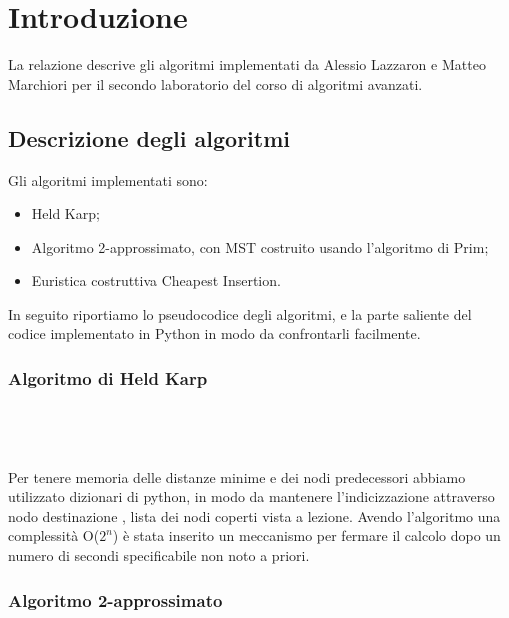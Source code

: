 \chapter{Introduzione\label{sec:introduzione}}
\noindent La relazione descrive gli algoritmi implementati da Alessio Lazzaron e Matteo Marchiori per il secondo laboratorio del corso di algoritmi avanzati.

\section{Descrizione degli algoritmi\label{sec:descrizione}}
Gli algoritmi implementati sono:
\begin{itemize}
    \item Held Karp;
    \item Algoritmo 2-approssimato, con MST costruito usando l'algoritmo di Prim;
    \item Euristica costruttiva Cheapest Insertion.
\end{itemize}

In seguito riportiamo lo pseudocodice degli algoritmi, e la parte saliente del codice implementato in Python in modo da confrontarli facilmente.

\subsection{Algoritmo di Held Karp\label{sec:hp}}
\begin{verbatim}
    
\end{verbatim}

\begin{verbatim}
    
\end{verbatim}

Per tenere memoria delle distanze minime e dei nodi predecessori abbiamo utilizzato dizionari di python, in modo da mantenere l'indicizzazione attraverso nodo destinazione , lista dei nodi coperti vista a lezione.
Avendo l'algoritmo una complessità O(\(2^{n}\)) è stata inserito un meccanismo per fermare il calcolo dopo un numero di secondi specificabile non noto a priori.

\clearpage

\subsection{Algoritmo 2-approssimato\label{sec:a2a}}
\begin{verbatim}
    
\end{verbatim}    

